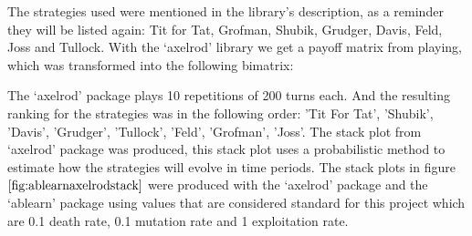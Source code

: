 The strategies used were mentioned in the library's description, as a reminder they will be listed again:
Tit for Tat, Grofman, Shubik, Grudger, Davis, Feld, Joss and Tullock.
With the ‘axelrod’  library we get a payoff matrix from playing, which was transformed into the following bimatrix:
\begin{table}[H]
\begin{center}
\end{center}
\caption{`Axelrod' package transformed payoff bimatrix for 8 strategies from Axelrod's tournament.}
\label{tab:axelrodmatrix}
\end{table}
The `axelrod' package plays 10 repetitions of 200 turns each. And the resulting ranking for the strategies was in the following order: 'Tit For Tat', 'Shubik', 'Davis', 'Grudger', 'Tullock', 'Feld', 'Grofman', 'Joss'.  The stack plot from `axelrod' package was produced, this stack plot uses a probabilistic method to estimate how the strategies will evolve in time periods. The stack plots in figure $\ref{fig:ablearnaxelrodstack}$ were produced with the `axelrod' package and the `ablearn' package using values that are considered standard for this project which are 0.1 death rate, 0.1 mutation rate and 1 exploitation rate.
